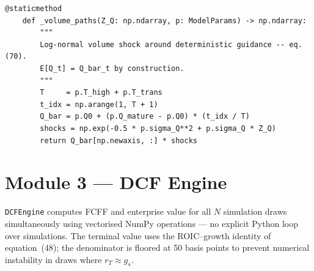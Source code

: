 \begin{lstlisting}[style=python, caption={StochasticPaths — exact GBM and OU discretisations}]
    @staticmethod
    def _volume_paths(Z_Q: np.ndarray, p: ModelParams) -> np.ndarray:
        """
        Log-normal volume shock around deterministic guidance -- eq. (70).
        E[Q_t] = Q_bar_t by construction.
        """
        T     = p.T_high + p.T_trans
        t_idx = np.arange(1, T + 1)
        Q_bar = p.Q0 + (p.Q_mature - p.Q0) * (t_idx / T)
        shocks = np.exp(-0.5 * p.sigma_Q**2 + p.sigma_Q * Z_Q)
        return Q_bar[np.newaxis, :] * shocks
\end{lstlisting}

\section*{Module 3 — DCF Engine}

\texttt{DCFEngine} computes FCFF and enterprise value for all $N$
simulation draws simultaneously using vectorised NumPy operations —
no explicit Python loop over simulations. The terminal value uses
the ROIC--growth identity of equation~(48); the denominator is
floored at 50 basis points to prevent numerical instability in draws
where $r_T \approx g_s$.

